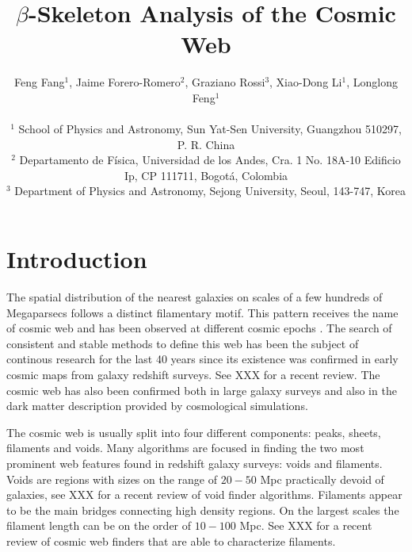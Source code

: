 \documentclass[useAMS,usenatbib]{mnras}
\begin{document}
\title[$\beta$-Skeleton Analysis]{$\beta$-Skeleton Analysis of the Cosmic Web}

\author[Fang, Forero-Romero, Rossi, Li \& Feng (2018)]
{Feng Fang$^1$, Jaime Forero-Romero$^2$, Graziano Rossi$^3$, Xiao-Dong Li$^1$, Longlong Feng$^1$ \\ \\
$^1$ School of Physics and Astronomy, Sun Yat-Sen University, Guangzhou 510297, P. R. China \\
$^2$ Departamento de F{\'i}sica, Universidad de los Andes, Cra. 1 No. 18A-10 Edificio Ip, CP 111711, Bogot{\'a}, Colombia \\
$^3$ Department of Physics and Astronomy, Sejong University, Seoul, 143-747, Korea}

\pagerange{\pageref{firstpage}--\pageref{lastpage}} 
\maketitle
\label{firstpage}


 

\section{Introduction}

The spatial distribution of the nearest galaxies on scales of a few
hundreds of Megaparsecs follows a distinct filamentary motif.
This pattern receives the name of cosmic web
\citep{1986ApJ...304...15B} and has been observed at
different cosmic epochs \citep{1986ApJ...302L...1D}.  
The search of consistent and stable methods to define this web has
been the subject of continous research for the last 40 years since its
existence was confirmed in early cosmic maps from galaxy redshift
surveys.
See XXX for a recent review.
The cosmic web has also been confirmed both in large galaxy surveys
and also in the dark matter description provided by cosmological
simulations.  

The cosmic web is usually split into four different components: peaks,
sheets, filaments and voids.
Many algorithms are focused in finding the two most prominent web features
found in redshift galaxy surveys: voids and filaments. 
Voids are regions with sizes on the range of $20-50$ Mpc
practically devoid of galaxies, see XXX for a recent review of
void finder algorithms.
Filaments appear to be the main bridges connecting high
density regions. 
On the largest scales the filament length can be on the order of
$10-100$ Mpc.
See XXX for a recent review of cosmic web finders that are able to
characterize filaments. 
\end{document}
